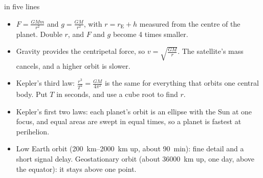 \begin{summarybox}[unbreakable]{ in five lines}
\begin{itemize}
  \item $F = \frac{GMm}{r^2}$ and $g = \frac{GM}{r^2}$, with $r = r_\mathrm{E} + h$ measured from
        the centre of the planet. Double $r$, and $F$ and $g$ become 4 times smaller.
  \item Gravity provides the centripetal force, so $v = \sqrt{\frac{GM}{r}}$. The satellite's mass
        cancels, and a higher orbit is slower.
  \item Kepler's third law: $\frac{r^3}{T^2} = \frac{GM}{4\pi^2}$ is the same for everything that
        orbits one central body. Put $T$ in seconds, and use a cube root to find $r$.
  \item Kepler's first two laws: each planet's orbit is an ellipse with the Sun at one focus,
        and equal areas are swept in equal times, so a planet is fastest at perihelion.
  \item Low Earth orbit (\qtyrange{200}{2000}{km} up, about \qty{90}{min}): fine detail and a
        short signal delay. Geostationary orbit (about \qty{36000}{km} up, one day, above the equator): it
        stays above one point.
\end{itemize}
\end{summarybox}
